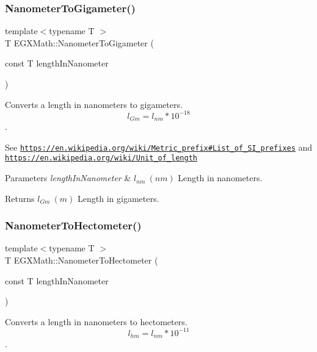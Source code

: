 \subsubsection{\texorpdfstring{Nanometer\+To\+Gigameter()}{NanometerToGigameter()}}
{\footnotesize\ttfamily template$<$typename T $>$ \\
T E\+G\+X\+Math\+::\+Nanometer\+To\+Gigameter (\begin{DoxyParamCaption}\item[{const T}]{length\+In\+Nanometer }\end{DoxyParamCaption})}



Converts a length in nanometers to gigameters. \[ l_{Gm}=l_{nm} * 10^{-18} \]. 

See \href{https://en.wikipedia.org/wiki/Metric_prefix#List_of_SI_prefixes}{\tt https\+://en.\+wikipedia.\+org/wiki/\+Metric\+\_\+prefix\#\+List\+\_\+of\+\_\+\+S\+I\+\_\+prefixes} and \href{https://en.wikipedia.org/wiki/Unit_of_length}{\tt https\+://en.\+wikipedia.\+org/wiki/\+Unit\+\_\+of\+\_\+length} 
\begin{DoxyParams}{Parameters}
{\em length\+In\+Nanometer} & $ l_{nm}\ (nm)$ Length in nanometers. \\
\hline
\end{DoxyParams}
\begin{DoxyReturn}{Returns}
$ l_{Gm}\ (m)$ Length in gigameters. 
\end{DoxyReturn}
\mbox{\label{group___e_g_x_math-_conversions-_length_conversions-_s_i-_nanometer-_s_i_ga106931c80902a638a38099d2fe2ba99e}} 
\subsubsection{\texorpdfstring{Nanometer\+To\+Hectometer()}{NanometerToHectometer()}}
{\footnotesize\ttfamily template$<$typename T $>$ \\
T E\+G\+X\+Math\+::\+Nanometer\+To\+Hectometer (\begin{DoxyParamCaption}\item[{const T}]{length\+In\+Nanometer }\end{DoxyParamCaption})}



Converts a length in nanometers to hectometers. \[ l_{hm}=l_{nm} * 10^{-11} \]. 


